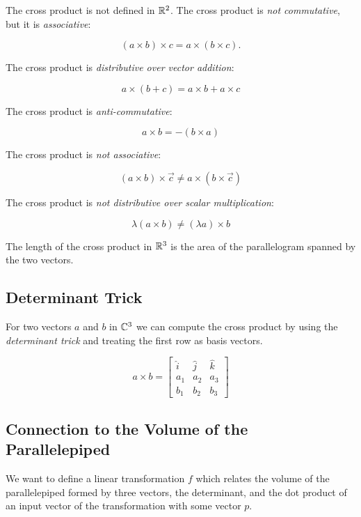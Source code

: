 The cross product is not defined in \(\mathbb{R}^2\). The cross product is \emph{not commutative}, but it is \emph{associative}:

\[
	(a \times b) \times c = a \times (b \times c).
\]

The cross product is \emph{distributive over vector addition}:

\[
	a \times (b + c) = a \times b + a \times c
\]

The cross product is \emph{anti-commutative}:

\[
	a \times b = -(b \times a)
\]

The cross product is \emph{not associative}:

\[
	(a \times b) \times \vec{c} \neq a \times (b \times \vec{c})
\]

The cross product is \emph{not distributive over scalar multiplication}:

\[
	\lambda(a \times b) \neq (\lambda a) \times b
\]

The length of the cross product in \(\mathbb{R}^3\) is the area of the parallelogram spanned by the two vectors.

\subsection{Determinant Trick}

For two vectors \(a\) and \(b\) in \(\mathbb{C}^3\) we can compute the cross product by using the \emph{determinant trick} and treating 
the first row as basis vectors. 

\[
    a \times b = 
    \begin{bmatrix}
        \hat{i} & \hat{j} & \hat{k} \\ 
        a_1 & a_2 & a_3 \\ 
        b_1 & b_2 & b_3 
    \end{bmatrix}
\]

\subsection{Connection to the Volume of the Parallelepiped}

We want to define a linear transformation \(f\) which relates the volume of the parallelepiped formed by three vectors, the determinant, and 
the dot product of an input vector of the transformation with some vector \(p\).  


